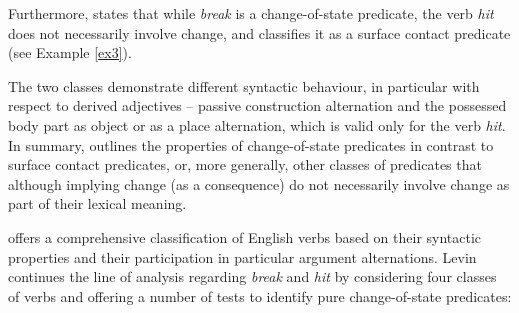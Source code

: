 \documentclass[output=paper,colorlinks,citecolor=brown]{langscibook}
\begin{document}
\begin{exe}
 \ex \label{ex1}
     \begin{xlist}
     \end{xlist}

 \ex \label{ex2}
     \begin{xlist}
     \end{xlist}
\end{exe}

Furthermore, \citet[131--132]{Fillmore1970} states that while \textit{break} is a change-of-state predicate, the verb \textit{hit} does not necessarily involve change, and classifies it as a surface contact predicate (see Example \ref{ex3}).

 \begin{exe}
 \ex \label{ex3}
     \begin{xlist}
     \end{xlist}
\end{exe}


The two classes demonstrate different syntactic behaviour, in particular with respect to derived adjectives -- passive construction alternation and the possessed body part as object or as a place alternation, which is valid only for the verb \textit{hit}. In summary, \citet[135--137]{Fillmore1970} outlines the properties of change-of-state predicates in contrast to surface contact predicates, or, more generally, other classes of predicates that although implying change (as a consequence) do not necessarily involve change as part of their lexical meaning.

\citet{Levin1993} offers a comprehensive classification of English verbs based on their syntactic properties and their participation in particular argument alternations. Levin continues the line of analysis regarding \textit{break} and \textit{hit} by considering four classes of verbs and offering a number of tests to identify pure change-of-state predicates:
\end{document}
